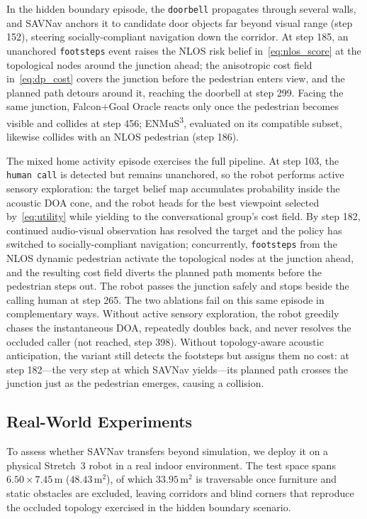 In the hidden boundary episode, the \texttt{doorbell} propagates through several walls, and SAVNav anchors it to candidate door objects far beyond visual range (step 152), steering socially-compliant navigation down the corridor. At step 185, an unanchored \texttt{footsteps} event raises the NLOS risk belief in~\eqref{eq:nlos_score} at the topological nodes around the junction ahead; the anisotropic cost field in~\eqref{eq:dp_cost} covers the junction before the pedestrian enters view, and the planned path detours around it, reaching the doorbell at step 299. Facing the same junction, Falcon+Goal Oracle reacts only once the pedestrian becomes visible and collides at step 456; ENMuS\textsuperscript{3}, evaluated on its compatible subset, likewise collides with an NLOS pedestrian (step 186).

The mixed home activity episode exercises the full pipeline. At step 103, the \texttt{human call} is detected but remains unanchored, so the robot performs active sensory exploration: the target belief map accumulates probability inside the acoustic DOA cone, and the robot heads for the best viewpoint selected by~\eqref{eq:utility} while yielding to the conversational group's cost field. By step 182, continued audio-visual observation has resolved the target and the policy has switched to socially-compliant navigation; concurrently, \texttt{footsteps} from the NLOS dynamic pedestrian activate the topological nodes at the junction ahead, and the resulting cost field diverts the planned path moments before the pedestrian steps out. The robot passes the junction safely and stops beside the calling human at step 265. The two ablations fail on this same episode in complementary ways. Without active sensory exploration, the robot greedily chases the instantaneous DOA, repeatedly doubles back, and never resolves the occluded caller (not reached, step 398). Without topology-aware acoustic anticipation, the variant still detects the footsteps but assigns them no cost: at step 182---the very step at which SAVNav yields---its planned path crosses the junction just as the pedestrian emerges, causing a collision.

\subsection{Real-World Experiments}
\label{subsec:exp-realworld}

To assess whether SAVNav transfers beyond simulation, we deploy it on a physical Stretch~3 robot in a real indoor environment. The test space spans $6.50 \times 7.45\,\mathrm{m}$ ($48.43\,\mathrm{m}^2$), of which $33.95\,\mathrm{m}^2$ is traversable once furniture and static obstacles are excluded, leaving corridors and blind corners that reproduce the occluded topology exercised in the hidden boundary scenario.

